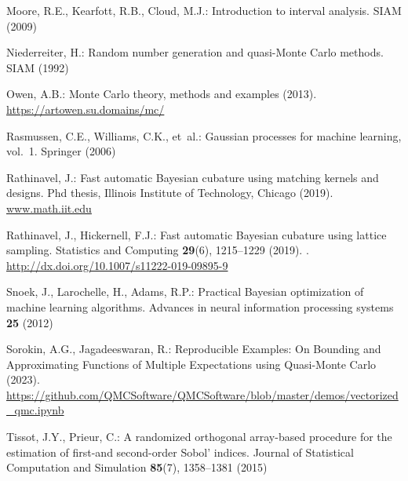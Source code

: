 \documentclass[graybox]{svmult}
\begin{document}
\begin{thebibliography}{10}
Moore, R.E., Kearfott, R.B., Cloud, M.J.: Introduction to interval analysis.
\newblock SIAM (2009)

Niederreiter, H.: Random number generation and quasi-Monte Carlo methods.
\newblock SIAM (1992)

Owen, A.B.: Monte Carlo theory, methods and examples (2013).
\newblock \urlprefix\url{https://artowen.su.domains/mc/}

Rasmussen, C.E., Williams, C.K., et~al.: Gaussian processes for machine
  learning, vol.~1.
\newblock Springer (2006)

Rathinavel, J.: {F}ast automatic {B}ayesian cubature using matching kernels and
  designs.
\newblock Phd thesis, Illinois Institute of Technology, Chicago (2019).
\newblock \urlprefix\url{www.math.iit.edu}

Rathinavel, J., Hickernell, F.J.: Fast automatic Bayesian cubature using
  lattice sampling.
\newblock Statistics and Computing \textbf{29}(6), 1215–1229 (2019).
\newblock {}.
\newblock \urlprefix\url{http://dx.doi.org/10.1007/s11222-019-09895-9}

Snoek, J., Larochelle, H., Adams, R.P.: Practical Bayesian optimization of
  machine learning algorithms.
\newblock Advances in neural information processing systems \textbf{25} (2012)

Sorokin, A.G., Jagadeeswaran, R.: {R}eproducible {E}xamples: {O}n {B}ounding
  and {A}pproximating {F}unctions of {M}ultiple {E}xpectations using
  {Q}uasi-{M}onte {C}arlo (2023).
\newblock
  \urlprefix\url{https://github.com/QMCSoftware/QMCSoftware/blob/master/demos/vectorized\_qmc.ipynb}

Tissot, J.Y., Prieur, C.: A randomized orthogonal array-based procedure for the
  estimation of first-and second-order Sobol' indices.
\newblock Journal of Statistical Computation and Simulation \textbf{85}(7),
  1358--1381 (2015)

\end{thebibliography}
\end{document}
